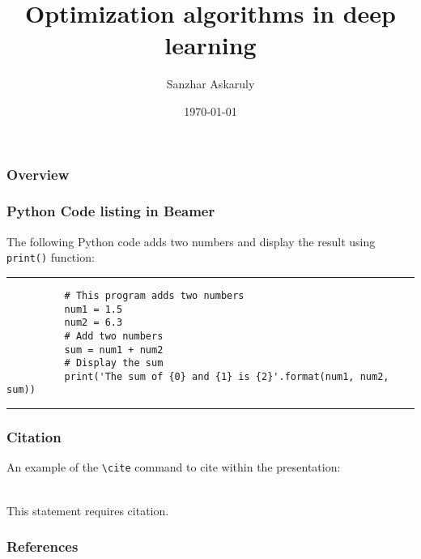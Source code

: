 \documentclass{beamer}
\title[CodeSeoul] %
	{Optimization algorithms in deep learning}
\author[AI Research Paper Review] %
	{Sanzhar Askaruly}
\institute[] %
	{ Ulsan National Institute of Science and Technology\newline
	  Ph.D. Candidate in Biomedical Engineering}
\date{\today}
\begin{document}

    \begin{frame}
    \frametitle{Overview} %
    \tableofcontents 
    \end{frame}

    \begin{frame}[fragile]
      \frametitle{Python Code listing in Beamer}
      The following Python code adds two numbers and display the result using \verb|print()| function:
      \rule{\textwidth}{1pt}
      \scriptsize
      \begin{verbatim}
          # This program adds two numbers
          num1 = 1.5
          num2 = 6.3
          # Add two numbers
          sum = num1 + num2
          # Display the sum
          print('The sum of {0} and {1} is {2}'.format(num1, num2, sum))
      \end{verbatim}
      \rule{\textwidth}{1pt}
    \end{frame}

    \begin{frame}[fragile] %
    \frametitle{Citation}
    An example of the \verb|\cite| command to cite within the presentation:\\~
    
    This statement requires citation.~\cite{test1} 
    \end{frame}

    \begin{frame}[t, allowframebreaks]
    \frametitle{References}
    
    
    \end{frame}
\end{document}
